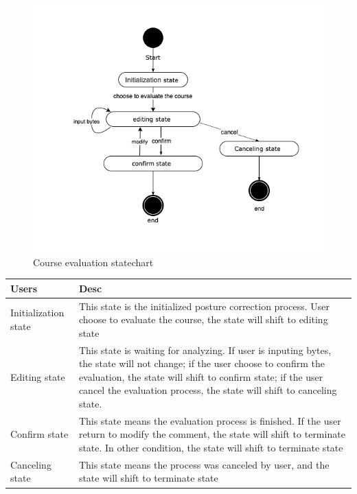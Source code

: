 \documentclass[16pt]{scrreprt}
\begin{document}
\begin{figure}[H]
    \centering
    \includegraphics[width=1.0\textwidth]{figures/stateschart2.png}
    \caption{Course evaluation statechart}
\end{figure}


\begin{center}
    \begin{tabular}{p{5cm}p{12cm}}
        \hline
        Users & Desc\\
        \hline
        Initialization state &  This state is the initialized posture correction process. User choose to evaluate the course, the state will shift to editing state \\
        \hline
        Editing state & This state is waiting for analyzing. If user is inputing bytes, the state will not change; if the user choose to confirm the evaluation, the state will shift to confirm state; if the user cancel the evaluation process, the state will shift to canceling state.\\
        \hline
        Confirm state & This state means the evaluation process is finished. If the user return to modify the comment, the state will shift to terminate state. In other condition, the state will shift to terminate state\\
        \hline
        Canceling state & This state means the process was canceled by user, and the state will shift to terminate state\\
        \hline
    \end{tabular}
\end{center}
\end{document}
